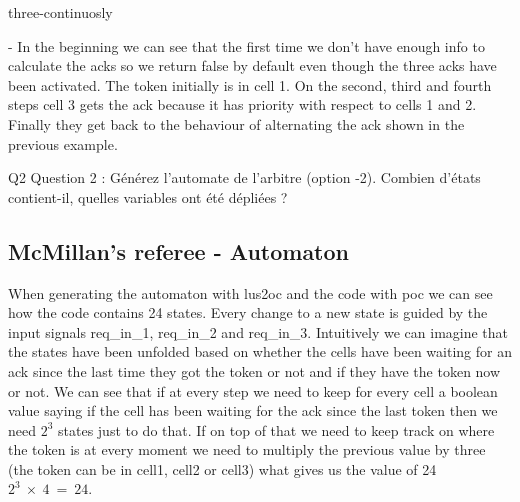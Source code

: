 \documentclass{article}
\begin{document}
three-continuosly

- In the beginning we can see that the first time we don't have enough info
to calculate the acks so we return false by default even though the three
acks have been activated. The token initially is in cell 1. On the second, third
and fourth steps cell 3 gets the ack because it has priority with respect to cells 
1 and 2. Finally they get back to the behaviour of alternating the ack shown in the
previous example.

Q2 Question 2 : Générez l'automate de l'arbitre (option -2). Combien d'états contient-il, quelles variables ont été dépliées ?

\subsection{McMillan's referee - Automaton}

When generating the automaton with lus2oc and the code with poc we can see how
the code contains 24 states. Every change to a new state is guided by the input
signals req\_in\_1, req\_in\_2 and req\_in\_3. Intuitively we can imagine that
the states have been unfolded based on whether the cells have been waiting for
an ack since the last time they got the token or not and if they have the token
now or not. We can see that if at every step we need to keep for every cell
a boolean value saying if the cell has been waiting for the ack since the last
token then we need $2^{3}$ states just to do that. If on top of that we need
to keep track on where the token is at every moment we need to multiply the 
previous value by three (the token can be in cell1, cell2 or cell3) what
gives us the value of 24 $2^{3}~\times~4~=~24$.

\end{document}
